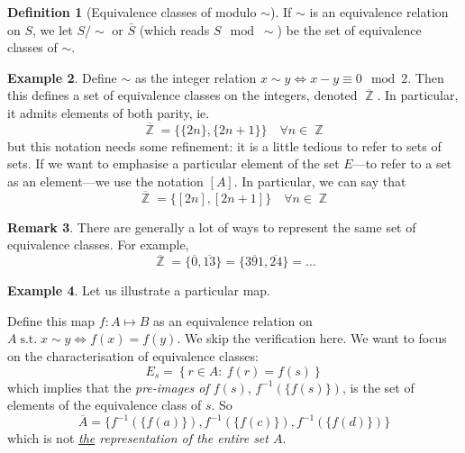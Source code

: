\documentclass[11pt]{amsart} %
\theoremstyle{definition}
\newtheorem{definition}{Definition}[section]
\newtheorem{example}[definition]{Example}
\theoremstyle{definition}
\newtheorem{remark}[definition]{Remark}
\DeclareMathOperator{\Z}{\mathbb{Z}}
\DeclareMathOperator{\suchthat}{\text{ s.t. }}
\numberwithin{equation}{section}
\newcommand{\condset}[4]{\left\{ #1  : \: #2 #3 #4 \right\}}
\begin{document}
\begin{definition}[Equivalence classes of modulo $\sim$]
	If $\sim$ is an equivalence relation on $S$, we let $S/\sim $ or $\bar{S}$ (which reads $S \mod \sim$) be the set of equivalence classes of $\sim$.
\end{definition}

\begin{example}
	Define $\sim$ as the integer relation $x \sim y \iff x - y \equiv 0 \mod 2$. Then this defines a set of equivalence classes on the integers, denoted $\overline{\Z}$. In particular, it admits elements of both parity, ie.
	$$ \overline{\Z}  = \{ \{2n \} , \{ 2n+ 1\}   \} \quad \forall n \in \Z$$
	but this notation needs some refinement: it is a little tedious to refer to sets of sets. If we want to emphasise a particular element of the set $E$---to refer to a set as an element---we use the notation $[A]$. In particular, we can say that
	$$ \overline{\Z}  = \{ [2n] , [2n+1]  \} \quad \forall n \in \Z$$
\end{example}

\begin{remark}
	There are generally a lot of ways to represent the same set of equivalence classes. For example,
	$$ \overline{\Z} = \{ \overline{0}, \overline{13} \} = \{ \overline{391}, \overline{24} \} = \dots $$
\end{remark}

\begin{example}
	Let us illustrate a particular map.
	
	\begin{figure}[H]
		\centering
	\end{figure}
	
	Define this map $f:A \mapsto B$ as an equivalence relation on $A \suchthat x \sim y  \iff  f(x) = f(y)$. We skip the verification here. We want to focus on the characterisation of equivalence classes:
	$$ E_s = \condset{  r \in A }{f(r) }{=}{f(s)} $$
	which implies that the \textit{pre-images of $f(s)$}, $f^{-1} ( \{f(s)\} )$, is the set of elements of the equivalence class of $s$. So
	$$ \overline{A} = \{ f^{-1} ( \{f(a)\} ), f^{-1} ( \{f(c)\} ) , f^{-1} ( \{f(d)\} )  \} $$
	which is not \textit{\uline{the} representation of the entire set $A$}.
\end{example}
\end{document}
